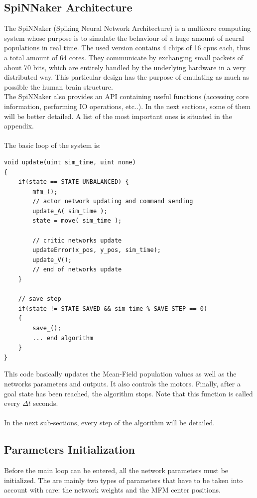 \documentclass{article}
\begin{document}
\subsection{SpiNNaker Architecture}
The SpiNNaker (Spiking Neural Network Architecture) is a multicore computing system whose purpose is to simulate the behaviour of a huge amount of neural populations in real time. The used version contains 4 chips of 16 cpus each, thus a total amount of 64 cores. They communicate by exchanging small packets of about 70 bits, which are entirely handled by the underlying hardware in a very distributed way. This particular design has the purpose of emulating as much as possible the human brain structure.\\

The SpiNNaker also provides an API containing useful functions (accessing core information, performing IO operations, etc..). In the next sections, some of them will be better detailed. A list of the most important ones is situated in the appendix.
\\ \\
The basic loop of the system is:
\begin{verbatim}
void update(uint sim_time, uint none)
{
    if(state == STATE_UNBALANCED) {
        mfm_();
        // actor network updating and command sending
        update_A( sim_time );
        state = move( sim_time );

        // critic networks update
        updateError(x_pos, y_pos, sim_time);
        update_V();
        // end of networks update
    }

    // save step
    if(state != STATE_SAVED && sim_time % SAVE_STEP == 0)           
    {
        save_();
        ... end algorithm
    }
}
\end{verbatim}
This code basically updates the Mean-Field population values as well as the networks parameters and outputs. It also controls the motors. Finally, after a goal state has been reached, the algorithm stops. Note that this function is called every \(\Delta t\) seconds. \\ \\
In the next sub-sections, every step of the algorithm will be detailed.

\subsection{Parameters Initialization}
Before the main loop can be entered, all the network parameters must be initialized. The are mainly two types of parameters that have to be taken into account with care: the network weights and the MFM center positions. \\ \\
\end{document}

